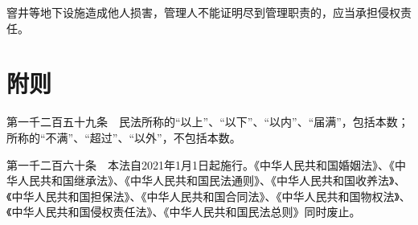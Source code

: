 \documentclass[UTF8,12pt,a4paper]{ctexbook}
\begin{document}
窨井等地下设施造成他人损害，管理人不能证明尽到管理职责的，应当承担侵权责任。

\cleardoublepage
{}
\part*{附则}

第一千二百五十九条　民法所称的“以上”、“以下”、“以内”、“届满”，包括本数；所称的“不满”、“超过”、“以外”，不包括本数。

第一千二百六十条　本法自2021年1月1日起施行。《中华人民共和国婚姻法》、《中华人民共和国继承法》、《中华人民共和国民法通则》、《中华人民共和国收养法》、《中华人民共和国担保法》、《中华人民共和国合同法》、《中华人民共和国物权法》、《中华人民共和国侵权责任法》、《中华人民共和国民法总则》同时废止。


	
\end{document}
